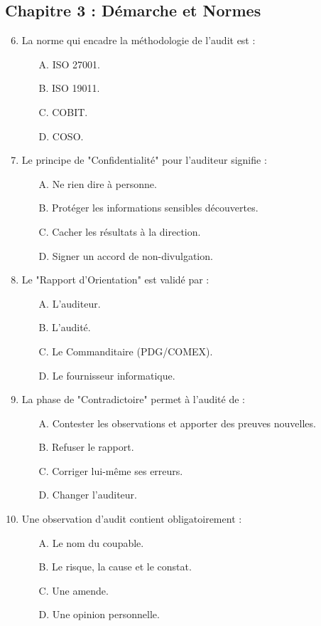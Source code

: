 \subsection*{Chapitre 3 : Démarche et Normes}
\begin{enumerate}
    \setcounter{enumi}{5}
    \item La norme qui encadre la méthodologie de l'audit est :
    \begin{itemize} \item[A.] ISO 27001. \item[B.] ISO 19011. \item[C.] COBIT. \item[D.] COSO. \end{itemize}
    \item Le principe de "Confidentialité" pour l'auditeur signifie :
    \begin{itemize} \item[A.] Ne rien dire à personne. \item[B.] Protéger les informations sensibles découvertes. \item[C.] Cacher les résultats à la direction. \item[D.] Signer un accord de non-divulgation. \end{itemize}
    \item Le "Rapport d'Orientation" est validé par :
    \begin{itemize} \item[A.] L'auditeur. \item[B.] L'audité. \item[C.] Le Commanditaire (PDG/COMEX). \item[D.] Le fournisseur informatique. \end{itemize}
    \item La phase de "Contradictoire" permet à l'audité de :
    \begin{itemize} \item[A.] Contester les observations et apporter des preuves nouvelles. \item[B.] Refuser le rapport. \item[C.] Corriger lui-même ses erreurs. \item[D.] Changer l'auditeur. \end{itemize}
    \item Une observation d'audit contient obligatoirement :
    \begin{itemize} \item[A.] Le nom du coupable. \item[B.] Le risque, la cause et le constat. \item[C.] Une amende. \item[D.] Une opinion personnelle. \end{itemize}
\end{enumerate}

